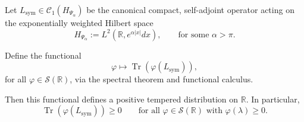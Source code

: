 \begin{lemma}
\label{sublem:trace-distribution-positive}
Let \( L_{\mathrm{sym}} \in \mathcal{C}_1(H_{\Psi_\alpha}) \) be the canonical compact, self-adjoint operator acting on the exponentially weighted Hilbert space
\[
H_{\Psi_\alpha} := L^2(\mathbb{R}, e^{\alpha |x|} dx), \qquad \text{for some } \alpha > \pi.
\]

Define the functional
\[
\varphi \mapsto \operatorname{Tr}(\varphi(L_{\mathrm{sym}})),
\]
for all \( \varphi \in \mathcal{S}(\mathbb{R}) \), via the spectral theorem and functional calculus.

Then this functional defines a positive tempered distribution on \( \mathbb{R} \). In particular,
\[
\operatorname{Tr}(\varphi(L_{\mathrm{sym}})) \ge 0 \qquad \text{for all } \varphi \in \mathcal{S}(\mathbb{R}) \text{ with } \varphi(\lambda) \ge 0.
\]
\end{lemma}
